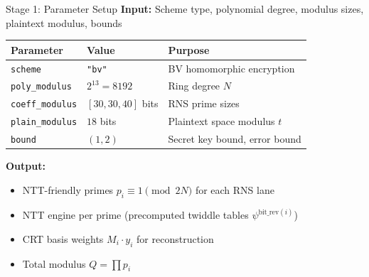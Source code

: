 \documentclass[aspectratio=169, 11pt]{beamer}
\begin{document}
\begin{frame}{Stage 1: Parameter Setup}
\textbf{Input:} Scheme type, polynomial degree, modulus sizes, plaintext modulus, bounds

\vspace{0.3em}
\begin{center}
\begin{tabular}{lll}
\toprule
\textbf{Parameter} & \textbf{Value} & \textbf{Purpose} \\
\midrule
\texttt{scheme} & \texttt{"bv"} & BV homomorphic encryption \\
\texttt{poly\_modulus} & $2^{13} = 8192$ & Ring degree $N$ \\
\texttt{coeff\_modulus} & $[30, 30, 40]$ bits & RNS prime sizes \\
\texttt{plain\_modulus} & $18$ bits & Plaintext space modulus $t$ \\
\texttt{bound} & $(1, 2)$ & Secret key bound, error bound \\
\bottomrule
\end{tabular}
\end{center}

\vspace{0.3em}
\textbf{Output:}
\begin{itemize}
    \item NTT-friendly primes $p_i \equiv 1 \pmod{2N}$ for each RNS lane
    \item NTT engine per prime (precomputed twiddle tables $\psi^{\text{bit\_rev}(i)}$)
    \item CRT basis weights $M_i \cdot y_i$ for reconstruction
    \item Total modulus $Q = \prod p_i$
\end{itemize}
\end{frame}
\end{document}
